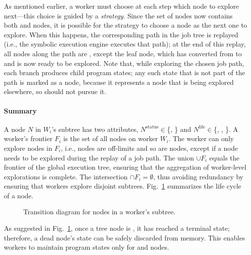 As mentioned earlier, a worker must choose at each step which \candidate node to explore next---this choice is guided by a {\em strategy}.  Since the set of \candidate nodes now contains both \materialized and \virtual nodes, it is possible for the strategy to choose a \virtual node as the next one to explore.  When this happens, the corresponding path in the job tree is replayed (i.e., the symbolic execution engine executes that path); at the end of this replay, all nodes along the path are \dead, except the leaf node, which has converted from \virtual to \materialized and is now ready to be explored.  Note that, while exploring the chosen job path, each branch produces child program states; any such state that is not part of the path is marked as a \fence node, because it represents a node that is being explored elsewhere, so \wdst should not pursue it.

\paragraph{Summary}

\newcommand{\status}{\ensuremath{\mathrm{status}}\xspace}
\newcommand{\alive}{\ensuremath{\mathrm{life}}\xspace}

A node $N$ in $W_i$'s subtree has two attributes, $N^{\status} \in$\{\materialized, \virtual\!\} and $N^{\alive} \in$\{\candidate, \fence, \dead\!\}.  A worker's frontier $F_i$ is the set of all \candidate nodes on worker $W_i$.  The worker can only explore nodes in $F_i$, i.e., \dead nodes are off-limits and so are \fence nodes, except if a \fence node needs to be explored during the replay of a job path.  The union $\cup F_i$ equals the frontier of the global execution tree, ensuring that the aggregation of worker-level explorations is complete.  The intersection $\cap F_i = \emptyset$, thus avoiding redundancy by ensuring that workers explore disjoint subtrees.  Fig.~\ref{fig:transitions} summarizes the life cycle of a node.

\begin{figure}[h!]
  \centering
  \hspace{-4mm}
  \caption{Transition diagram for nodes in a worker's subtree.}
 \label{fig:transitions}
\end{figure}

As suggested in Fig.~\ref{fig:transitions}, once a tree node is \dead, it has reached a terminal state; therefore, a dead node's state can be safely discarded from memory.  This enables workers to maintain program states only for \candidate and \fence nodes.

